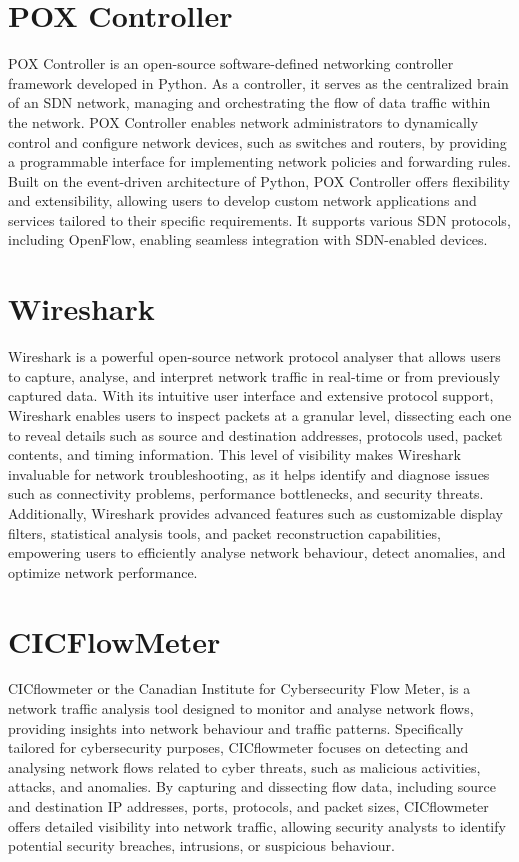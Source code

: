 \section{POX Controller}
\vspace{-18pt}
POX Controller is an open-source software-defined networking controller framework developed in Python. As a controller, it serves as the centralized brain of an SDN network, managing and orchestrating the flow of data traffic within the network. POX Controller enables network administrators to dynamically control and configure network devices, such as switches and routers, by providing a programmable interface for implementing network policies and forwarding rules. Built on the event-driven architecture of Python, POX Controller offers flexibility and extensibility, allowing users to develop custom network applications and services tailored to their specific requirements. It supports various SDN protocols, including OpenFlow, enabling seamless integration with SDN-enabled devices.
\section{Wireshark}
\vspace{-18pt}
Wireshark is a powerful open-source network protocol analyser that allows users to capture, analyse, and interpret network traffic in real-time or from previously captured data. With its intuitive user interface and extensive protocol support, Wireshark enables users to inspect packets at a granular level, dissecting each one to reveal details such as source and destination addresses, protocols used, packet contents, and timing information. This level of visibility makes Wireshark invaluable for network troubleshooting, as it helps identify and diagnose issues such as connectivity problems, performance bottlenecks, and security threats. Additionally, Wireshark provides advanced features such as customizable display filters, statistical analysis tools, and packet reconstruction capabilities, empowering users to efficiently analyse network behaviour, detect anomalies, and optimize network performance.
\section{CICFlowMeter}
\vspace{-18pt}
CICflowmeter or the Canadian Institute for Cybersecurity Flow Meter, is a network traffic analysis tool designed to monitor and analyse network flows, providing insights into network behaviour and traffic patterns. Specifically tailored for cybersecurity purposes, CICflowmeter focuses on detecting and analysing network flows related to cyber threats, such as malicious activities, attacks, and anomalies. By capturing and dissecting flow data, including source and destination IP addresses, ports, protocols, and packet sizes, CICflowmeter offers detailed visibility into network traffic, allowing security analysts to identify potential security breaches, intrusions, or suspicious behaviour.
